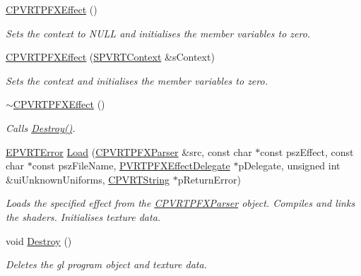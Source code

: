 \begin{DoxyCompactItemize}
\item 
\hyperlink{class_c_p_v_r_t_p_f_x_effect_a03a1b67e3020138caf10cde2846c008e}{C\+P\+V\+R\+T\+P\+F\+X\+Effect} ()
\begin{DoxyCompactList}\small\item\em Sets the context to N\+U\+L\+L and initialises the member variables to zero. \end{DoxyCompactList}\item 
\hyperlink{class_c_p_v_r_t_p_f_x_effect_a97850cdfaca8d60704f46775957e7afc}{C\+P\+V\+R\+T\+P\+F\+X\+Effect} (\hyperlink{struct_s_p_v_r_t_context}{S\+P\+V\+R\+T\+Context} \&s\+Context)
\begin{DoxyCompactList}\small\item\em Sets the context and initialises the member variables to zero. \end{DoxyCompactList}\item 
\hyperlink{class_c_p_v_r_t_p_f_x_effect_aa276e3a5b8efe4ef748f106fdc37aa37}{$\sim$\+C\+P\+V\+R\+T\+P\+F\+X\+Effect} ()
\begin{DoxyCompactList}\small\item\em Calls \hyperlink{class_c_p_v_r_t_p_f_x_effect_ab54c25a5a7640077db0cd241cefa3671}{Destroy()}. \end{DoxyCompactList}\item 
\hyperlink{_p_v_r_t_error_8h_a9e837ff1a83f3a5f332bc4cc78454608}{E\+P\+V\+R\+T\+Error} \hyperlink{class_c_p_v_r_t_p_f_x_effect_a7335d99bda5a7c05b0e7347292a08d0a}{Load} (\hyperlink{class_c_p_v_r_t_p_f_x_parser}{C\+P\+V\+R\+T\+P\+F\+X\+Parser} \&src, const char $\ast$const psz\+Effect, const char $\ast$const psz\+File\+Name, \hyperlink{class_p_v_r_t_p_f_x_effect_delegate}{P\+V\+R\+T\+P\+F\+X\+Effect\+Delegate} $\ast$p\+Delegate, unsigned int \&ui\+Unknown\+Uniforms, \hyperlink{class_c_p_v_r_t_string}{C\+P\+V\+R\+T\+String} $\ast$p\+Return\+Error)
\begin{DoxyCompactList}\small\item\em Loads the specified effect from the \hyperlink{class_c_p_v_r_t_p_f_x_parser}{C\+P\+V\+R\+T\+P\+F\+X\+Parser} object. Compiles and links the shaders. Initialises texture data. \end{DoxyCompactList}\item 
void \hyperlink{class_c_p_v_r_t_p_f_x_effect_ab54c25a5a7640077db0cd241cefa3671}{Destroy} ()
\begin{DoxyCompactList}\small\item\em Deletes the gl program object and texture data. \end{DoxyCompactList}\item 

\end{DoxyCompactItemize}
